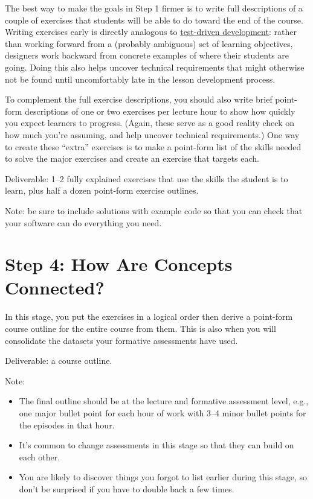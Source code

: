 The best way to make the goals in Step 1 firmer is to write full
descriptions of a couple of exercises that students will be able to do
toward the end of the course. Writing exercises early is directly
analogous to
\href{https://en.wikipedia.org/wiki/Test-driven_development}{test-driven
development}: rather than working forward from a (probably ambiguous)
set of learning objectives, designers work backward from concrete
examples of where their students are going. Doing this also helps
uncover technical requirements that might otherwise not be found until
uncomfortably late in the lesson development process.

To complement the full exercise descriptions, you should also write
brief point-form descriptions of one or two exercises per lecture hour
to show how quickly you expect learners to progress. (Again, these serve
as a good reality check on how much you're assuming, and help uncover
technical requirements.) One way to create these ``extra'' exercises is
to make a point-form list of the skills needed to solve the major
exercises and create an exercise that targets each.

Deliverable: 1--2 fully explained exercises that use the skills the
student is to learn, plus half a dozen point-form exercise outlines.

Note: be sure to include solutions with example code so that you can
check that your software can do everything you need.

\section*{Step 4: How Are Concepts Connected?}

In this stage, you put the exercises in a logical order then derive a
point-form course outline for the entire course from them. This is also
when you will consolidate the datasets your formative assessments have
used.

Deliverable: a course outline.

Note:

\begin{itemize}
\item
  The final outline should be at the lecture and formative assessment
  level, e.g., one major bullet point for each hour of work with 3--4
  minor bullet points for the episodes in that hour.
\item
  It's common to change assessments in this stage so that they can build
  on each other.
\item
  You are likely to discover things you forgot to list earlier during
  this stage, so don't be surprised if you have to double back a few
  times.
\end{itemize}

